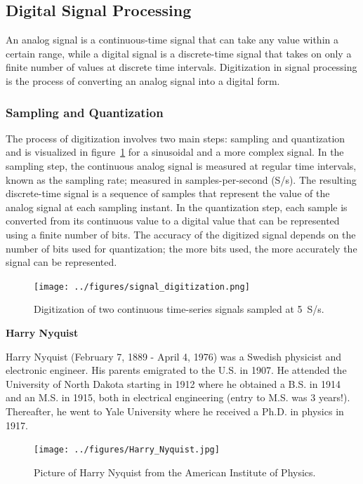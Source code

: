 \documentclass[12pt,letter]{article}
\begin{document}
\subsection{Digital Signal Processing}

 An analog signal is a continuous-time signal that can take any value within a certain range, while a digital signal is a discrete-time signal that takes on only a finite number of values at discrete time intervals. Digitization in signal processing is the process of converting an analog signal into a digital form.

\subsubsection{Sampling and Quantization}


The process of digitization involves two main steps: sampling and quantization and is visualized in figure~\ref{fig:signal_digitization} for a sinusoidal and a more complex signal. In the sampling step, the continuous analog signal is measured at regular time intervals, known as the sampling rate; measured in samples-per-second (S/s). The resulting discrete-time signal is a sequence of samples that represent the value of the analog signal at each sampling instant. In the quantization step, each sample is converted from its continuous value to a digital value that can be represented using a finite number of bits. The accuracy of the digitized signal depends on the number of bits used for quantization; the more bits used, the more accurately the signal can be represented.



\begin{figure}[H]
    \centering
    \texttt{[image: ../figures/signal\_digitization.png]}
    \caption{Digitization of two continuous time-series signals sampled at 5~S/s.}
    \label{fig:signal_digitization}
\end{figure}



	\begin{review}
	\label{sec:Harry_Nyquist}
		
		\textbf{Harry Nyquist}

		\noindent Harry Nyquist (February 7, 1889 - April 4, 1976) was a Swedish physicist and electronic engineer. His parents emigrated to the U.S. in 1907.  He attended the University of North Dakota starting in 1912 where he obtained a B.S. in 1914 and an M.S. in 1915, both in electrical engineering (entry to M.S. was 3 years!). Thereafter, he went to Yale University where he received a Ph.D. in physics in 1917.

		\begin{figure}[H]
			\centering
			\texttt{[image: ../figures/Harry\_Nyquist.jpg]}
			\caption{Picture of Harry Nyquist from the American Institute of Physics.\protect\footnotemark[1]}
			\label{fig:Harry_Nyquist}
		\end{figure}
	\end{review}
\end{document}
